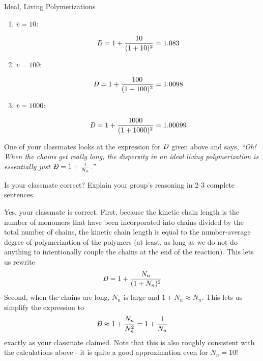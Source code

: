 \begin{activity}{Ideal, Living Polymerizations}
\begin{ctqs}
\begin{enumerate}
			\item $\bar v = 10$:
			
				\begin{solution}[0.25in]
					\begin{equation*}
						\PDImath = 1+\frac{10}{(1+10)^2} = 1.083
					\end{equation*}
				\end{solution}
			
			\item $\bar v = 100$:
			
				\begin{solution}[0.25in]
					\begin{equation*}
						\PDImath = 1+\frac{100}{(1+100)^2} = 1.0098
					\end{equation*}
				\end{solution}
			
			\item $\bar v = 1000$:
			
				\begin{solution}[0.25in]
					\begin{equation*}
						\PDImath = 1+\frac{1000}{(1+1000)^2} = 1.00099
					\end{equation*}
				\end{solution}
			
		\end{enumerate}
		
	\question One of your classmates looks at the expression for $\PDImath$ given above and says, \emph{``Oh!  When the chains get really long, the dispersity in an ideal living polymerization is essentially just $\PDImath = 1+\frac{1}{N_n}$.''}
	
		Is your classmate correct?  Explain your group's reasoning in 2-3 complete sentences.
		
		\begin{solution}[2in]
			Yes, your classmate is correct.  First, because the kinetic chain length is the number of monomers that have been incorporated into chains divided by the total number of chains, the kinetic chain length is equal to the number-average degree of polymerization of the polymers (at least, as long as we do not do anything to intentionally couple the chains at the end of the reaction).  This lets us rewrite
	\begin{equation*}
		\PDImath = 1+\frac{N_n}{(1+N_n)^2}
	\end{equation*}
			Second, when the chains are long, $N_n$ is large and $1+N_n \approx N_n$.  This lets us simplify the expression to 
	\begin{equation*}
		\PDImath \approx 1+\frac{N_n}{N_n^2} = 1+\frac{1}{N_n}
	\end{equation*}
	exactly as your classmate claimed. Note that this is also roughly consistent with the calculations above - it is quite a good approximation even for $N_n=10$!
		\end{solution}
		

\end{ctqs}
\end{activity}
